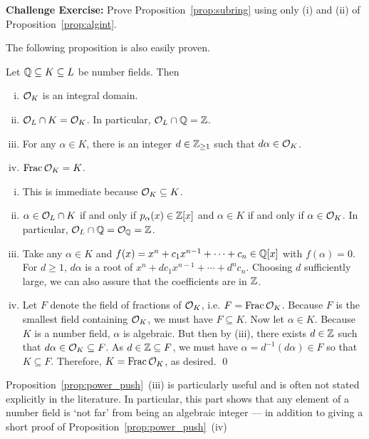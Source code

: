 \noindent \textbf{Challenge Exercise:} Prove Proposition~\ref{prop:subring} using only (i) and (ii) of Proposition~\ref{prop:algint}. \pskip


The following proposition is also easily proven. 


\begin{prop} \label{prop:power_push} 
Let $\mathbb{Q} \subseteq K \subseteq L$ be number fields. Then
\begin{enumerate}[(i)]
\item $\mathcal{O}_K$ is an integral domain.
\item $\mathcal{O}_L \cap K= \mathcal{O}_K$. In particular, $\mathcal{O}_L \cap \mathbb{Q}= \mathbb{Z}$.
\item For any $\alpha \in K$, there is an integer $d \in \mathbb{Z}_{\geq 1}$ such that $d \alpha \in \mathcal{O}_K$.
\item $\operatorname{Frac} \mathcal{O}_K= K$.
\end{enumerate}
\end{prop}

\pf \hfill
\begin{enumerate}[(i)]
\item This is immediate because $\mathcal{O}_K \subseteq K$.

\item $\alpha \in \mathcal{O}_L \cap K$ if and only if $p_\alpha(x) \in \mathbb{Z}[x]$ and $\alpha \in K$ if and only if $\alpha \in \mathcal{O}_K$. In particular, $\mathcal{O}_L \cap \mathbb{Q}= \mathcal{O}_{\mathbb{Q}}= \mathbb{Z}$.

\item Take any $\alpha \in K$ and $f(x)= x^n + c_1 x^{n-1} + \cdots + c_n \in \mathbb{Q}[x]$ with $f(\alpha)= 0$. For $d \geq 1$, $d \alpha$ is a root of $x^n + d c_1 x^{n-1} + \cdots + d^n c_n$. Choosing $d$ sufficiently large, we can also assure that the coefficients are in $\mathbb{Z}$. 

\item Let $F$ denote the field of fractions of $\mathcal{O}_K$, i.e. $F= \operatorname{Frac} \mathcal{O}_K$. Because $F$ is the smallest field containing $\mathcal{O}_K$, we must have $F \subseteq K$. Now let $\alpha \in K$. Because $K$ is a number field, $\alpha$ is algebraic. But then by (iii), there exists $d \in \mathbb{Z}$ such that $d \alpha \in \mathcal{O}_K \subseteq F$. As $d \in \mathbb{Z} \subseteq F$, we must have $\alpha= d^{-1}(d\alpha) \in F$ so that $K \subseteq F$. Therefore, $K= \operatorname{Frac} \mathcal{O}_K$, as desired. \qed 
\end{enumerate}


Proposition~\ref{prop:power_push}~(iii) is particularly useful and is often not stated explicitly in the literature. In particular, this part shows that any element of a number field is `not far' from being an algebraic integer --- in addition to giving a short proof of Proposition~\ref{prop:power_push}~(iv)



